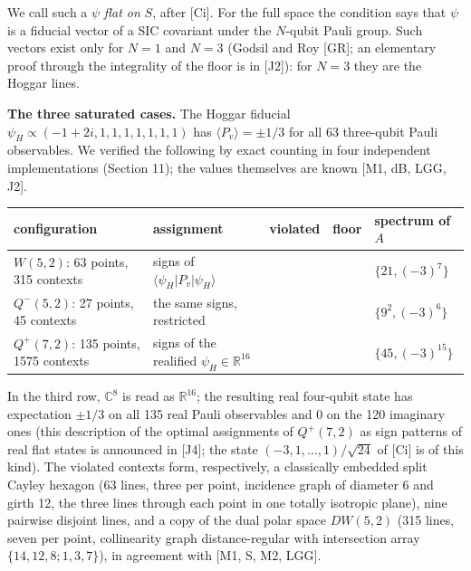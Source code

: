 \documentclass[11pt,a4paper]{article}
\begin{document}
We call such a \(\psi\) \emph{flat on} \(S\), after {[}Ci{]}. For the full space the condition says that \(\psi\) is a
fiducial vector of a SIC covariant under the \(N\)-qubit Pauli group. Such vectors exist only for \(N = 1\)
and \(N = 3\) (Godsil and Roy {[}GR{]}; an elementary proof through the integrality of the floor is in {[}J2{]}):
for \(N = 3\) they are the Hoggar lines.

\textbf{The three saturated cases.} The Hoggar fiducial \(\psi_H \propto (-1+2i, 1, 1, 1, 1, 1, 1, 1)\) has
\(\langle P_v \rangle = \pm 1/3\) for all 63 three-qubit Pauli observables. We verified the following by
exact counting in four independent implementations (Section 11); the values themselves are known
{[}M1, dB, LGG, J2{]}.

{\def\LTcaptype{none} %
{\small
\begin{longtable}[]{@{}>{\raggedright\arraybackslash}p{}>{\raggedright\arraybackslash}p{}>{\raggedright\arraybackslash}p{}>{\raggedright\arraybackslash}p{}>{\raggedright\arraybackslash}p{}@{}}
\toprule\noalign{}
configuration & assignment & violated & floor & spectrum of \(A\) \\
\midrule\noalign{}
\endhead
\bottomrule\noalign{}
\endlastfoot
\(W(5,2)\): 63 points, 315 contexts & signs of \(\langle\psi_H\vert P_v\vert \psi_H\rangle\) & 63 & 63 & \(\{21, (-3)^7\}\) \\
\(Q^-(5,2)\): 27 points, 45 contexts & the same signs, restricted & 9 & 9 & \(\{9^2, (-3)^6\}\) \\
\(Q^+(7,2)\): 135 points, 1575 contexts & signs of the realified \(\psi_H \in \mathbb{R}^{16}\) & 315 & 315 & \(\{45, (-3)^{15}\}\) \\
\end{longtable}
}
}

In the third row, \(\mathbb{C}^8\) is read as \(\mathbb{R}^{16}\); the resulting real four-qubit state has
expectation \(\pm 1/3\) on all 135 real Pauli observables and \(0\) on the 120 imaginary ones (this
description of the optimal assignments of \(Q^+(7,2)\) as sign patterns of real flat states is
announced in {[}J4{]}; the state \((-3,1,\dots,1)/\sqrt{24}\) of {[}Ci{]} is of this kind). The violated contexts
form, respectively, a classically embedded split Cayley
hexagon (63 lines, three per point, incidence graph of diameter 6 and girth 12, the three lines through
each point in one totally isotropic plane), nine pairwise disjoint lines, and a copy of the dual polar
space \(DW(5,2)\) (315 lines, seven per point, collinearity graph distance-regular with intersection
array \(\{14,12,8;1,3,7\}\)), in agreement with {[}M1, S, M2, LGG{]}.
\end{document}
